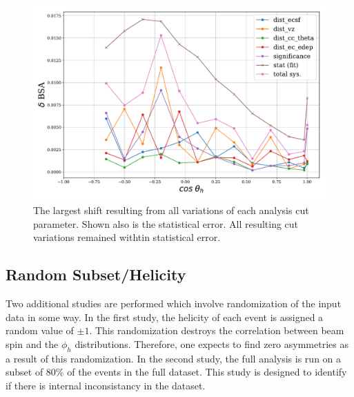 \begin{figure}
  \begin{center}
    \includegraphics[width=12cm]{image/systematics.pdf}
    \caption{The largest shift resulting from all variations of each analysis cut parameter.  Shown also is the statistical error.  All resulting cut variations remained withtin statistical error.}
  \end{center}
\end{figure}

\subsection{Random Subset/Helicity}

Two additional studies are performed which involve randomization of the input data in some way.  In the first study, the helicity of each event is assigned a random value of $\pm 1$.  This randomization destroys the correlation between beam spin and the $\phi_h$ distributions.  Therefore, one expects to find zero asymmetries as a result of this randomization.  In the second study, the full analysis is run on a subset of 80\% of the events in the full dataset.  This study is designed to identify if there is internal inconsistancy in the dataset.
\\

